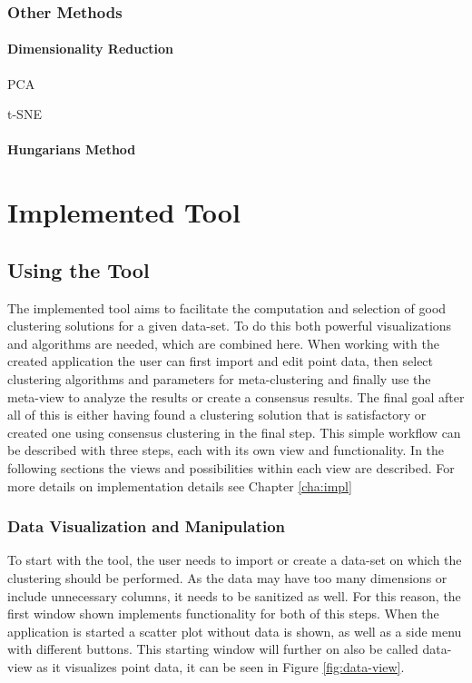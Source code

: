 \documentclass[
	a4paper,
	english,
	twoside,
	openright,               
	11pt                            
	]{report}
\begin{document}
\section{Other Methods}
\subsection{Dimensionality Reduction}\label{sec:dim_reduction}
PCA \cite{pca}

 t-SNE \cite{Maaten2008VisualizingDU}

\subsection{Hungarians Method}


\part{Implemented Tool}
\chapter{Using the Tool}\label{cha:Tool}
The implemented tool aims to facilitate the computation and selection of good clustering solutions for a given data-set. To do this both powerful visualizations and algorithms are needed, which are combined here. When working with the created application the user can first import and edit point data, then select clustering algorithms and parameters for meta-clustering and finally use the meta-view to analyze the results or create a consensus results. The final goal after all of this is either having found a clustering solution that is satisfactory or created one using consensus clustering in the final step. This simple workflow can be described with three steps, each with its own view and functionality. In the following sections the views and possibilities within each view are described. For more details on implementation details see Chapter \ref{cha:impl}

\section{Data Visualization and Manipulation}
To start with the tool, the user needs to import or create a data-set on which the clustering should be performed. As the data may have too many dimensions or include unnecessary columns, it needs to be sanitized as well. For this reason, the first window shown implements functionality for both of this steps. When the application is started a scatter plot without data is shown, as well as a side menu with different buttons. This starting window will further on also be called data-view as it visualizes point data, it can be seen in Figure \ref{fig:data-view}. 
\end{document}
